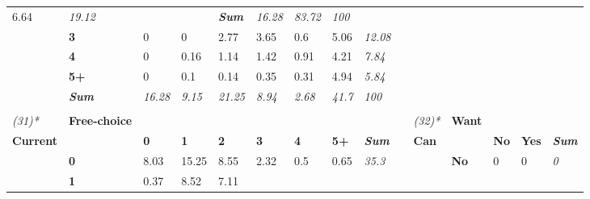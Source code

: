 \begin{table}
{\begin{threeparttable}
\begin{tabular}{lllllllllllllll}
  \cellcolor[HTML]{DBDBDB}6.64 &
  \textit{19.12} &
   &
   &
  \textit{\textbf{Sum}} &
  \textit{16.28} &
  \textit{83.72} &
  \textit{100} \\
 &
  \textbf{3} &
  \cellcolor[HTML]{FFFFFF}0 &
  \cellcolor[HTML]{FFFFFF}0 &
  \cellcolor[HTML]{F0F0F0}2.77 &
  \cellcolor[HTML]{ECECEC}3.65 &
  \cellcolor[HTML]{FCFCFC}0.6 &
  \cellcolor[HTML]{E4E4E4}5.06 &
  \textit{12.08} &
   &
   &
   &
   &
   &
  \textit{} \\
 &
  \textbf{4} &
  \cellcolor[HTML]{FFFFFF}0 &
  \cellcolor[HTML]{FFFFFF}0.16 &
  \cellcolor[HTML]{F9F9F9}1.14 &
  \cellcolor[HTML]{F8F8F8}1.42 &
  \cellcolor[HTML]{FBFBFB}0.91 &
  \cellcolor[HTML]{E8E8E8}4.21 &
  \textit{7.84} &
   &
   &
   &
   &
   &
  \textit{} \\
 &
  \textbf{5+} &
  \cellcolor[HTML]{FFFFFF}0 &
  \cellcolor[HTML]{FFFFFF}0.1 &
  \cellcolor[HTML]{FFFFFF}0.14 &
  \cellcolor[HTML]{FEFEFE}0.35 &
  \cellcolor[HTML]{FEFEFE}0.31 &
  \cellcolor[HTML]{E4E4E4}4.94 &
  \textit{5.84} &
   &
   &
   &
   &
   &
  \textit{} \\
\textit{} &
  \textit{\textbf{Sum}} &
  \textit{16.28} &
  \textit{9.15} &
  \textit{21.25} &
  \textit{8.94} &
  \textit{2.68} &
  \textit{41.7} &
  \textit{100} &
  \textit{} &
  \textit{} &
  \textit{} &
  \textit{} &
  \textit{} &
  \textit{} \\
\textit{} &
  \textit{\textbf{}} &
  \textit{} &
  \textit{} &
  \textit{} &
  \textit{} &
  \textit{} &
  \textit{} &
  \textit{} &
  \textit{} &
  \textit{} &
  \textit{} &
  \textit{} &
  \textit{} &
  \textit{} \\
\textit{(31)*} &
  \textbf{Free-choice} &
   &
   &
   &
   &
   &
   &
  \textit{} &
   &
  \textit{(32)*} &
  \textbf{Want} &
   &
   &
  \textit{} \\
\textbf{Current} &
   &
  \textbf{0} &
  \textbf{1} &
  \textbf{2} &
  \textbf{3} &
  \textbf{4} &
  \textbf{5+} &
  \textit{\textbf{Sum}} &
  \textbf{} &
  \textbf{Can} &
   &
  \textbf{No} &
  \textbf{Yes} &
  \textit{\textbf{Sum}} \\
 &
  \textbf{0} &
  \cellcolor[HTML]{D1D1D1}8.03 &
  \cellcolor[HTML]{A6A6A6}15.25 &
  \cellcolor[HTML]{CECECE}8.55 &
  \cellcolor[HTML]{F2F2F2}2.32 &
  \cellcolor[HTML]{FDFDFD}0.5 &
  \cellcolor[HTML]{FCFCFC}0.65 &
  \textit{35.3} &
   &
   &
  \textbf{No} &
  \cellcolor[HTML]{FFFFFF}0 &
  \cellcolor[HTML]{FFFFFF}0 &
  \textit{0} \\
 &
  \textbf{1} &
  \cellcolor[HTML]{FDFDFD}0.37 &
  \cellcolor[HTML]{CECECE}8.52 &
  \cellcolor[HTML]{D6D6D6}7.11 &

\end{tabular}
\end{threeparttable}}
\end{table}

